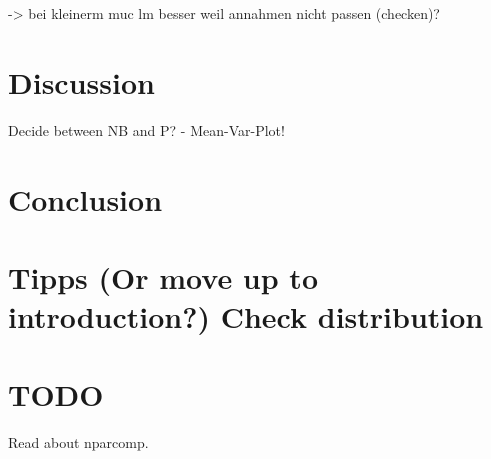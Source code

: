\documentclass{scrartcl}\usepackage[]{graphicx}\usepackage[]{color}
\begin{document}
-> bei kleinerm muc lm besser weil annahmen nicht passen (checken)?


\section{Discussion}

Decide between NB and P? - Mean-Var-Plot!

\section{Conclusion}

\appendix
\section{Tipps
(Or move up to introduction?)
Check distribution}


\section{TODO}
Read about nparcomp.
\end{document}
